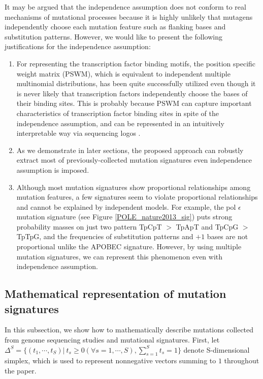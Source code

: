 It may be argued that the independence assumption does not conform to real mechanisms of mutational processes 
because it is highly unlikely that mutagens independently choose each mutation feature such as flanking bases and substitution patterns. 
However, we would like to present the following justifications for the independence assumption: 

\begin{enumerate}
\item
For representing the transcription factor binding motifs, the position specific weight matrix (PSWM), 
which is equivalent to independent multiple multinomial distributions, 
has been quite successfully utilized 
even though it is never likely that transcription factors independently choose the bases of their binding sites. 
This is probably because PSWM can capture important characteristics of transcription factor binding sites 
in spite of the independence assumption,
and can be represented in an intuitively interpretable way via sequencing logos \cite{pmid2172928}.

\item
As we demonstrate in later sections, 
the proposed approach can robustly extract most of previously-collected mutation signatures even independence assumption is imposed.

\item
Although most mutation signatures show proportional relationships among mutation features, 
a few signatures seem to violate proportional relationships and cannot be explained by independent models. 
For example, the pol $\epsilon$ mutation signature \cite{pmid23945592} (see Figure \ref{POLE_nature2013_sig}) puts strong probability masses 
on just two pattern TpCpT $>$ TpApT and TpCpG $>$ TpTpG, 
and the frequencies of substitution patterns and $+1$ bases are not proportional unlike the APOBEC signature.
However,  by using multiple mutation signatures, we can represent this phenomenon even with independence assumption.
\end{enumerate}






\subsection*{Mathematical representation of mutation signatures} 

In this subsection, 
we show how to mathematically describe mutations collected from genome sequencing studies and mutational signatures.
First, let $\Delta^S = \{ (t_1, \cdots, t_S) |\ t_s \geq 0 (\forall s = 1, \cdots, S), \sum_{s=1}^S t_s = 1 \}$ denote S-dimensional simplex,
which is used to represent nonnegative vectors summing to $1$ throughout the paper.

